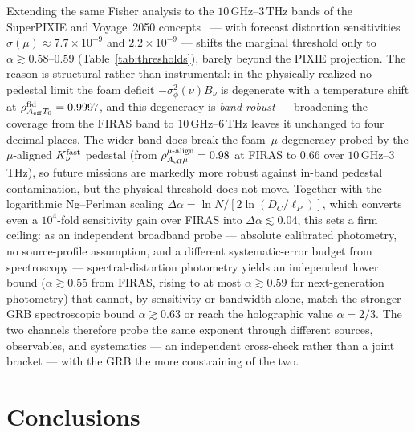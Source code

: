 \documentclass[aps,prd,onecolumn,amsmath,amssymb]{revtex4-2}
\begin{document}
Extending the same Fisher analysis to the $10$\,GHz--$3$\,THz bands of
the SuperPIXIE and Voyage~2050 concepts~\cite{Chluba2021} --- with
forecast distortion sensitivities
$\sigma(\mu)\approx 7.7\times10^{-9}$ and $2.2\times10^{-9}$ ---
shifts the marginal threshold only to $\alpha\gtrsim 0.58$--$0.59$
(Table~\ref{tab:thresholds}), barely beyond the
PIXIE projection.  The reason is structural rather than instrumental:
in the physically realized no-pedestal limit the foam deficit
$-\sigma_\phi^2(\nu)B_\nu$ is degenerate with a temperature shift at
$\rho^{\rm fid}_{A_{\rm eff}T_0}=0.9997$, and this degeneracy is
\emph{band-robust} --- broadening the coverage from the FIRAS band to
$10$\,GHz--$6$\,THz leaves it unchanged to four decimal places.  The
wider band does break the foam--$\mu$ degeneracy probed by the
$\mu$-aligned $K_\nu^{\rm fast}$ pedestal (from
$\rho^{\mu\text{-align}}_{A_{\rm eff}\mu}=0.98$ at FIRAS to $0.66$ over
$10$\,GHz--$3$\,THz), so future missions are markedly more robust
against in-band pedestal contamination, but the physical threshold does
not move.  Together with the logarithmic Ng--Perlman scaling
$\Delta\alpha=\ln N/[2\ln(D_C/\ell_P)]$, which converts even a
$10^{4}$-fold sensitivity gain over FIRAS into
$\Delta\alpha\lesssim 0.04$, this sets a firm ceiling: as an
independent broadband probe --- absolute calibrated photometry, no
source-profile assumption, and a different systematic-error budget from
spectroscopy --- spectral-distortion photometry yields an independent
lower bound ($\alpha\gtrsim 0.55$ from FIRAS, rising to at most
$\alpha\gtrsim 0.59$ for next-generation photometry) that cannot, by
sensitivity or bandwidth alone, match the stronger GRB spectroscopic
bound $\alpha\gtrsim 0.63$ or reach the holographic value $\alpha=2/3$.  The two channels therefore
probe the same exponent through different sources, observables, and
systematics --- an independent cross-check rather than a joint bracket
--- with the GRB the more constraining of the two.

\section{Conclusions}
\label{sec:conclusions}
\end{document}
